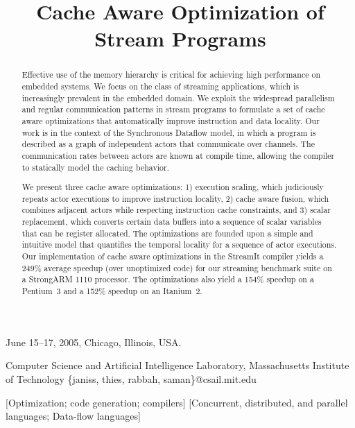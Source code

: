 \documentclass{sigplanconf}
\begin{document}
 {June 15--17, 2005, Chicago, Illinois, USA.}

\title{Cache Aware Optimization of Stream Programs}
	     {Computer Science and Artificial Intelligence Laboratory, Massachusetts Institute of Technology}
	     {\{janiss, thies, rabbah, saman\}@csail.mit.edu}

\maketitle

\begin{abstract}
Effective use of the memory hierarchy is critical for achieving high
performance on embedded systems.  We focus on the class of streaming
applications, which is increasingly prevalent in the embedded domain.  We
exploit the widespread parallelism and regular communication patterns
in stream programs to formulate a set of cache aware optimizations
that automatically improve instruction and data locality.  Our work is
in the context of the Synchronous Dataflow model, in which a program
is described as a graph of independent actors that communicate over
channels.  The communication rates between actors are known at compile
time, allowing the compiler to statically model the caching behavior.

We present three cache aware optimizations: 1) execution scaling,
which judiciously repeats actor executions to improve instruction
locality, 2) cache aware fusion, which combines adjacent actors while
respecting instruction cache constraints, and 3) scalar replacement,
which converts certain data buffers into a sequence of scalar
variables that can be register allocated.  The optimizations are
founded upon a simple and intuitive model that quantifies the temporal
locality for a sequence of actor executions.  Our implementation of
cache aware optimizations in the StreamIt compiler yields a 249\%
average speedup (over unoptimized code) for our streaming benchmark
suite on a StrongARM 1110 processor.  The optimizations also yield a
154\% speedup on a Pentium~3 and a 152\% speedup on an Itanium~2.

\end{abstract}

[Optimization; code generation; compilers]
[Concurrent, distributed, and parallel languages; Data-flow languages]
\end{document}
